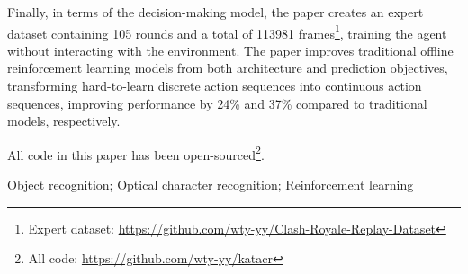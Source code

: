\noindent Finally, in terms of the decision-making model, the paper creates an expert dataset containing 105 rounds and a total of 113981 frames\footnote{Expert dataset: \url{https://github.com/wty-yy/Clash-Royale-Replay-Dataset}\hfill}, training the agent without interacting with the environment. The paper improves traditional offline reinforcement learning models from both architecture and prediction objectives, transforming hard-to-learn discrete action sequences into continuous action sequences, improving performance by 24\% and 37\% compared to traditional models, respectively.

\noindent All code in this paper has been open-sourced\footnote{All code: \url{https://github.com/wty-yy/katacr}}.

\vspace{\baselineskip}
 Object recognition; Optical character recognition; Reinforcement learning


